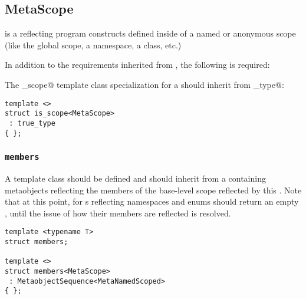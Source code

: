 \subsection{MetaScope}
\label{concept-MetaScope}

 is a  reflecting program constructs defined inside
of a named or anonymous scope (like the global scope, a namespace, a class, etc.)

In addition to the requirements inherited from , the following is required:

The \verb@is_scope@ template class specialization for a  should
inherit from \verb@true_type@:

\begin{verbatim}
template <>
struct is_scope<MetaScope>
 : true_type
{ };
\end{verbatim}

\subsubsection{\texttt{members}}

A template class \verb@members@ should be defined and should inherit from a
 containing  metaobjects reflecting
the members of the base-level scope reflected by this .
Note that at this point, for s reflecting namespaces and enums
\verb@members@ should return an empty , until the
issue of how their members are reflected is resolved.


\begin{verbatim}
template <typename T>
struct members;

template <>
struct members<MetaScope>
 : MetaobjectSequence<MetaNamedScoped>
{ };
\end{verbatim}

